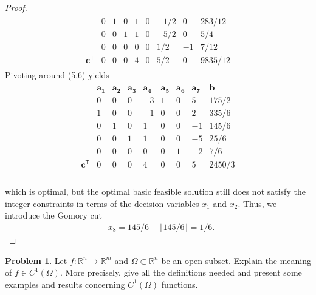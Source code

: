 \documentclass[12pt]{article}
\theoremstyle{definition}
\newtheorem{problem}{Problem}
\newcommand{\vc}[1]{\boldsymbol{#1}}
\newcommand{\tran}{\mathsf{T}}
\begin{document}
\begin{proof}
\begin{align*}
\begin{matrix}
      & 0 & 1 & 0 & 1 & 0 & -1/2 & 0 & 283/12 \\
      & 0 & 0 & 1 & 1 & 0 & -5/2 & 0 & 5/4 \\
      & 0 & 0 & 0 & 0 & 0 & 1/2 & -1 & 7/12\\
      \vc{c}^\tran & 0 & 0 & 0 & 4 & 0 & 5/2 & 0 & 9835/12
    \end{matrix}
  \end{align*}
  Pivoting around (5,6) yields
  \begin{align*}
    \begin{matrix}
      & \vc{a_1} & \vc{a_2} & \vc{a_3} & \vc{a_4} & \vc{a_5} & \vc{a_6} & \vc{a_7} & \vc{b} \\
      & 0 & 0 & 0 & -3 & 1 &  0 & 5 & 175/2 \\
      & 1 & 0 & 0 & -1 & 0 & 0 & 2 & 335/6 \\
      & 0 & 1 & 0 & 1 & 0 & 0 & -1 & 145/6 \\
      & 0 & 0 & 1 & 1 & 0 & 0 & -5 & 25/6 \\
      & 0 & 0 & 0 & 0 & 0 & 1 & -2 & 7/6\\
      \vc{c}^\tran & 0 & 0 & 0 & 4 & 0 & 0 & 5 & 2450/3\\
    \end{matrix}
  \end{align*}

  which is optimal, but the optimal basic feasible solution still does not satisfy the integer
  constraints in terms of the decision variables $x_1$ and $x_2$. Thus, we introduce the Gomory cut
  \begin{align*}
    -x_8 = 145/6 - \lfloor145/6\rfloor = 1/6.
  \end{align*}
\end{proof}
\newpage


\begin{problem}
  Let $f:\mathbb{R}^n \to \mathbb{R}^m$ and $\Omega \subset \mathbb{R}^n$ be an open subset.
  Explain the meaning of $f\in C^1(\Omega)$. More precisely, give all the definitions needed and present some examples
  and results concerning $C^1(\Omega)$ functions.
\end{problem}
\end{document}
